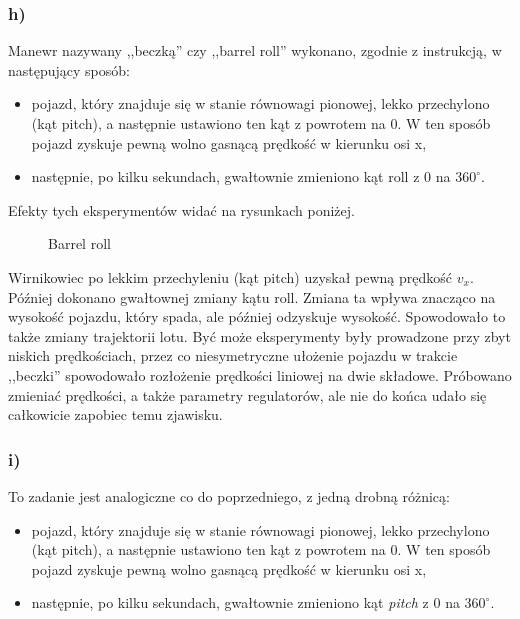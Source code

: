 \documentclass[11pt, a4paper]{article}
\begin{document}
\subsubsection*{h)}

Manewr nazywany ,,beczką'' czy ,,barrel roll'' wykonano, zgodnie z instrukcją, w następujący sposób:
\begin{itemize}
\item pojazd, który znajduje się w stanie równowagi pionowej, lekko przechylono (kąt pitch), a następnie ustawiono ten kąt z powrotem na 0. W ten sposób pojazd zyskuje pewną wolno gasnącą prędkość w kierunku osi x,
\item następnie, po kilku sekundach, gwałtownie zmieniono kąt roll z 0 na $360^{\circ}$.
\end{itemize}

Efekty tych eksperymentów widać na rysunkach poniżej.
\begin{figure}[htbp!]
	\centering
	
	\hfill%
	\hfill%
	\hfill%
	
	\caption{Barrel roll \label{fig:mobile16h}}
\end{figure}

Wirnikowiec po lekkim przechyleniu (kąt pitch) uzyskał pewną prędkość $v_x$. Później dokonano gwałtownej zmiany kątu roll. Zmiana ta wpływa znacząco na wysokość pojazdu, który spada, ale później odzyskuje wysokość. Spowodowało to także zmiany trajektorii lotu. Być może eksperymenty były prowadzone przy zbyt niskich prędkościach, przez co niesymetryczne ułożenie pojazdu w trakcie ,,beczki'' spowodowało rozłożenie prędkości liniowej na dwie składowe. Próbowano zmieniać prędkości, a także parametry regulatorów, ale nie do końca udało się całkowicie zapobiec temu zjawisku.

\subsubsection*{i)}

To zadanie jest analogiczne co do poprzedniego, z jedną drobną różnicą:
\begin{itemize}
\item pojazd, który znajduje się w stanie równowagi pionowej, lekko przechylono (kąt pitch), a następnie ustawiono ten kąt z powrotem na 0. W ten sposób pojazd zyskuje pewną wolno gasnącą prędkość w kierunku osi x,
\item następnie, po kilku sekundach, gwałtownie zmieniono kąt \emph{pitch} z 0 na $360^{\circ}$.
\end{itemize}
\end{document}
